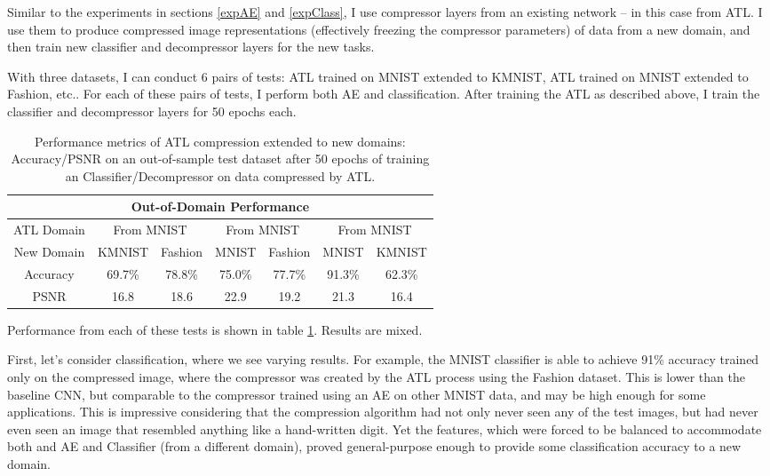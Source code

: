 \documentclass[twoside,11pt]{article}
\begin{document}
Similar to the experiments in sections \ref{expAE} and \ref{expClass}, I use compressor
layers from an existing network -- in this case from ATL. I use them to produce compressed
image representations (effectively freezing the compressor parameters) of data
from a new domain, and then train 
new classifier and decompressor layers for the new tasks. 

With three datasets, I can conduct 6 pairs of tests: ATL trained on MNIST extended to
KMNIST, ATL trained on MNIST extended to Fashion, etc.. For each of these pairs of tests, 
I perform both AE and classification. After training the ATL as described above, 
I train the classifier and decompressor layers for 50 epochs each.


\begin{table}[h]
  \centering
  \begin{tabular}{|c||c|c|c|c|c|c|}
    \hline
    \multicolumn{7}{|c|}{Out-of-Domain Performance}\\
    \hline
    ATL Domain & \multicolumn{2}{|c|}{From MNIST} & 
      \multicolumn{2}{|c|}{From MNIST}& \multicolumn{2}{|c|}{From MNIST}\\
    \hline
    New Domain & KMNIST & Fashion & MNIST & Fashion & MNIST & KMNIST\\  \hline    
    Accuracy & 69.7\% & 78.8\% & 75.0\% & 77.7\% & 91.3\% & 62.3\%\\  \hline
    PSNR & 16.8 & 18.6& 22.9& 19.2 & 21.3& 16.4\\  \hline
  \end{tabular}
  \caption{Performance metrics of ATL compression extended to new domains:
   Accuracy/PSNR on an out-of-sample test dataset after 50 epochs of 
   training an Classifier/Decompressor on
   data compressed by ATL.}
  \label{table:domain}
\end{table}


Performance from each of these tests is shown in table \ref{table:domain}. Results are mixed.

First, let's consider classification, where we see varying results. For example, the MNIST 
classifier is able to achieve 91\% accuracy trained only on the compressed image, where
the compressor was created by the ATL process using the Fashion dataset. This is lower than 
the baseline CNN, but comparable to the compressor trained using an AE on other MNIST data,
and may be high enough for some applications. This is impressive considering that the compression
algorithm had not only never seen any of the test images, but had never even seen an image
that resembled anything like a hand-written digit. Yet the features, which were forced to be 
balanced to accommodate both and AE and Classifier (from a different domain), proved 
general-purpose enough to provide some classification accuracy to a new domain.
\end{document}
